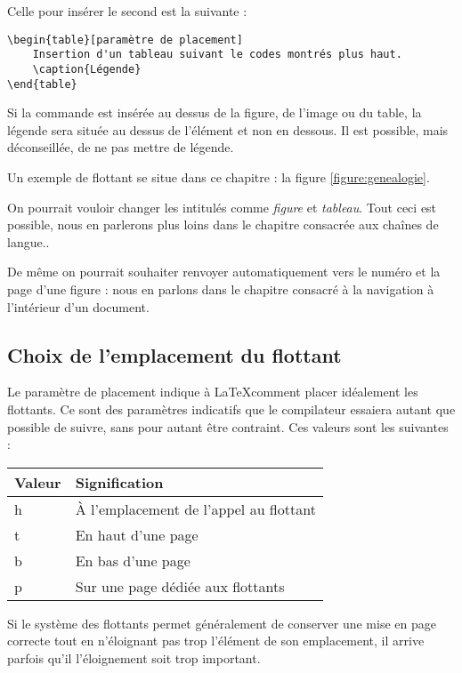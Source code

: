 Celle pour insérer le second est la suivante :
\begin{verbatim}
\begin{table}[paramètre de placement]
	Insertion d'un tableau suivant le codes montrés plus haut.
	\caption{Légende}
\end{table} 
\end{verbatim}

Si la commande  est insérée au dessus de la figure, de l'image ou du table, la légende sera située au dessus de l'élément et non en dessous. Il est possible, mais déconseillée, de ne pas mettre de légende.

Un exemple de flottant se situe  dans ce chapitre : la figure \ref{figure:genealogie}.
\begin{attention}
	On pourrait vouloir changer les intitulés comme \emph{figure} et \emph{tableau}. Tout ceci est possible, nous en parlerons plus loins dans le chapitre consacrée aux chaînes de langue..
	
	De même on pourrait souhaiter renvoyer automatiquement vers le numéro et la page d'une figure : nous en parlons dans le chapitre consacré à la navigation à l'intérieur d'un document.
\end{attention}

\subsection{Choix de l'emplacement du flottant}

Le paramètre de placement indique à \LaTeX comment placer idéalement les flottants. Ce sont des paramètres indicatifs que le compilateur essaiera autant que possible de suivre, sans pour autant être contraint. Ces valeurs sont les suivantes :

\begin{longtable}{l|l}
	Valeur & Signification	\\
	\hline
	\endhead
	h 	& À l'emplacement de l'appel au flottant 	\\
	t 	& En haut d'une page				\\
	b 	& En bas d'une page				\\
	p 	& Sur une page dédiée aux flottants		\\
\end{longtable}


Si le système des flottants permet généralement de conserver une mise en page correcte tout en n'éloignant pas trop l'élément de son emplacement, il arrive parfois qu'il l'éloignement soit trop important.


